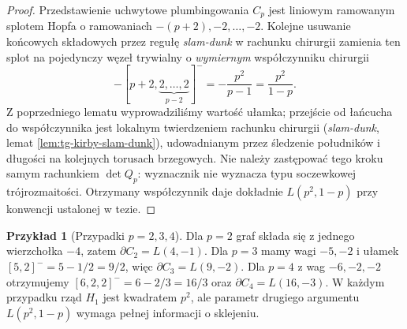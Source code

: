 \documentclass[11pt,a4paper]{report}
\numberwithin{equation}{section}
\theoremstyle{plain}
\theoremstyle{definition}
\newtheorem{przyklad}[twierdzenie]{Przykład}
\theoremstyle{remark}
\begin{document}
\begin{proof}
Przedstawienie uchwytowe plumbingowania $C_p$
jest liniowym ramowanym splotem Hopfa o ramowaniach
$-(p+2),-2,\ldots,-2$.
Kolejne usuwanie końcowych składowych przez
regułę \emph{slam-dunk} w rachunku chirurgii
zamienia ten splot na pojedynczy węzeł trywialny
o \emph{wymiernym} współczynniku chirurgii
\[
-[p+2,\underbrace{2,\ldots,2}_{p-2}]^-
=-\frac{p^2}{p-1}=\frac{p^2}{1-p}.
\]
Z poprzedniego lematu wyprowadziliśmy wartość
ułamka; przejście od łańcucha do współczynnika
jest lokalnym twierdzeniem rachunku chirurgii
(\emph{slam-dunk}, lemat \ref{lem:tg-kirby-slam-dunk}),
udowadnianym przez śledzenie
południków i długości na kolejnych torusach brzegowych.
Nie należy zastępować tego kroku samym rachunkiem
$\det Q_p$: wyznacznik nie wyznacza typu soczewkowej
trójrozmaitości. Otrzymany współczynnik daje dokładnie
$L(p^2,1-p)$ przy konwencji ustalonej w tezie.
\end{proof}

\begin{przyklad}[Przypadki $p=2,3,4$]
Dla $p=2$ graf składa się z jednego wierzchołka
$-4$, zatem $\partial C_2=L(4,-1)$.
Dla $p=3$ mamy wagi $-5,-2$ i ułamek
$[5,2]^-=5-1/2=9/2$, więc
$\partial C_3=L(9,-2)$.
Dla $p=4$ z wag $-6,-2,-2$ otrzymujemy
$[6,2,2]^-=6-2/3=16/3$ oraz
$\partial C_4=L(16,-3)$.
W każdym przypadku rząd $H_1$ jest kwadratem $p^2$,
ale parametr drugiego argumentu $L(p^2,1-p)$
wymaga pełnej informacji o sklejeniu.
\end{przyklad}

\begin{center}
\end{center}
\end{document}
